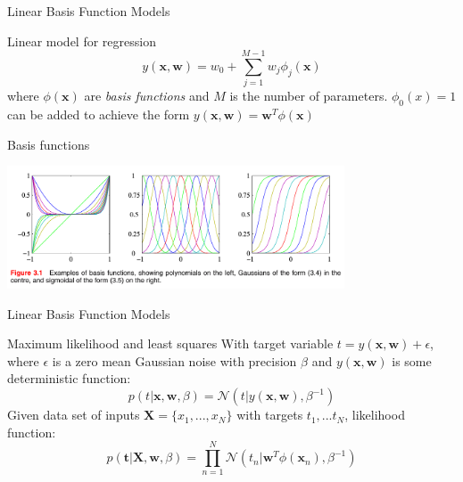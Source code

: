 \documentclass[9pt]{beamer}
\title{\hmwkClass}
\subtitle{\hmwkTitle}
\date{Lecture date: \hmwkDueDate}
\author[\hmwkAuthorLastName]{\hmwkAuthorFullName}
\begin{document}
\maketitle

\begin{frame}{Linear Basis Function Models}
    \begin{alertblock}{Linear model for regression}
        \[ y(\mathbf{x}, \mathbf{w}) = w_0 + \sum_{j=1}^{M-1} w_j \phi_j(\mathbf{x}) \]
        where $\phi(\mathbf{x})$ are \textit{basis functions} and $M$ is the number of parameters. $\phi_0(x) = 1$ can be added to achieve the form $y(\mathbf{x}, \mathbf{w}) = \mathbf{w}^T \phi(\mathbf{x})$
    \end{alertblock}
    \begin{alertblock}{Basis functions}
        \begin{center}
            \setlength{\fboxsep}{0.5pt} %
            \setlength{\fboxrule}{0.5pt}
            \includegraphics[width=10cm,fbox]{../images/Bishop_MachineLearning_Figure3-1.png} %
        \end{center}
    \end{alertblock}
\end{frame}

\begin{frame}{Linear Basis Function Models}
    \begin{alertblock}{Maximum likelihood and least squares}
        With target variable $t = y(\mathbf{x}, \mathbf{w}) + \epsilon$, where $\epsilon$ is a zero mean Gaussian noise with precision $\beta$ and $y(\mathbf{x}, \mathbf{w})$ is some deterministic function:
        \[ p(t | \mathbf{x}, \mathbf{w}, \beta) = \mathcal{N}\left( t | y(\mathbf{x}, \mathbf{w}), \beta^{-1} \right) \]
        Given data set of inputs $\mathbf{X} = \{x_1,...,x_N\}$ with targets $t_1,...t_N$, likelihood function:
        \[ p(\mathbf{t} | \mathbf{X}, \mathbf{w}, \beta) = \prod_{n=1}^{N}\mathcal{N}(t_n | \mathbf{w}^T \phi(\mathbf{x}_n), \beta^{-1}) \]
    \end{alertblock}
\end{frame}

\end{document}
